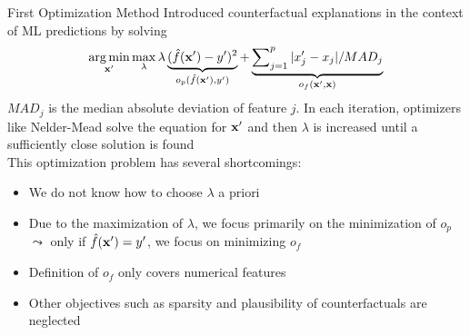 \documentclass[10pt,compress,t,notes=noshow, xcolor=table]{beamer}
\begin{document}
\begin{frame}{First Optimization Method }
Introduced counterfactual explanations in the context of ML predictions by solving
		\begin{equation}
			\mathop{\mathrm{arg\,min}}_{\mathbf{x}'} \max_{\lambda} \lambda \underbrace{(\hat{f}(\mathbf{x}') - y')^2}_{o_p(\hat{f}(\mathbf{x}'), y')} + \underbrace{\sum\nolimits_{j = 1}^p |x'_j - x_j|/MAD_j}_{o_f(\mathbf{x}', \mathbf{x})}
		\end{equation}
	$MAD_j$ is the median absolute deviation of feature $j$. In each iteration, optimizers like Nelder-Mead solve the equation for $\mathbf{x}'$ and then $\lambda$ is increased until a sufficiently close solution is found \\[0.2cm]
	
	
	This optimization problem has several shortcomings: 	
	\begin{itemize}%
		\item We do not know how to choose $\lambda$ a priori 
		\item Due to the maximization of $\lambda$, we focus primarily on the minimization of $o_p$\\
		$\leadsto$ only if $\hat{f}(\mathbf{x}') = y'$, we focus on minimizing $o_f$ 
		\item Definition of $o_f$ only covers numerical features 
		\item Other objectives such as sparsity and plausibility of counterfactuals are neglected
	\end{itemize}
	


\end{frame}
\end{document}
